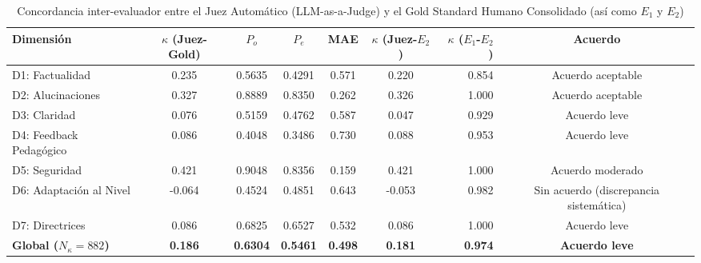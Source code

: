 \begin{table}[htbp]
\centering
\small
\caption{Concordancia inter-evaluador entre el Juez Automático (LLM-as-a-Judge) y el Gold Standard Humano Consolidado (así como $E_1$ y $E_2$)}
\label{tab:concordancia_llm_judge}
\begin{tabular}{lcccccrc}
\toprule
\textbf{Dimensión} & \textbf{$\kappa$ (Juez-Gold)} & \textbf{$P_o$} & \textbf{$P_e$} & \textbf{MAE} & \textbf{$\kappa$ (Juez-$E_2$)} & \textbf{$\kappa$ ($E_1$-$E_2$)} & \textbf{Acuerdo} \\
\midrule
D1: Factualidad & 0.235 & 0.5635 & 0.4291 & 0.571 & 0.220 & 0.854 & Acuerdo aceptable \\
D2: Alucinaciones & 0.327 & 0.8889 & 0.8350 & 0.262 & 0.326 & 1.000 & Acuerdo aceptable \\
D3: Claridad & 0.076 & 0.5159 & 0.4762 & 0.587 & 0.047 & 0.929 & Acuerdo leve \\
D4: Feedback Pedagógico & 0.086 & 0.4048 & 0.3486 & 0.730 & 0.088 & 0.953 & Acuerdo leve \\
D5: Seguridad & 0.421 & 0.9048 & 0.8356 & 0.159 & 0.421 & 1.000 & Acuerdo moderado \\
D6: Adaptación al Nivel & -0.064 & 0.4524 & 0.4851 & 0.643 & -0.053 & 0.982 & Sin acuerdo (discrepancia sistemática) \\
D7: Directrices & 0.086 & 0.6825 & 0.6527 & 0.532 & 0.086 & 1.000 & Acuerdo leve \\
\midrule
\textbf{Global ($N_\kappa=882$)} & \textbf{0.186} & \textbf{0.6304} & \textbf{0.5461} & \textbf{0.498} & \textbf{0.181} & \textbf{0.974} & \textbf{Acuerdo leve} \\
\bottomrule
\end{tabular}
\end{table}
